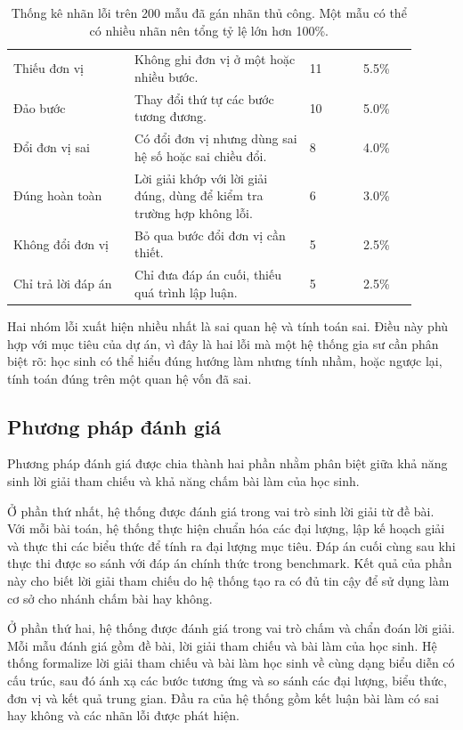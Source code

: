\documentclass[12pt,a4paper]{article}
\begin{document}
\begin{table}[H]
\begin{tabular}{p{0.27\linewidth} p{0.39\linewidth} p{0.12\linewidth} p{0.12\linewidth}}
        Thiếu đơn vị & Không ghi đơn vị ở một hoặc nhiều bước. & 11 & 5.5\% \\
        Đảo bước & Thay đổi thứ tự các bước tương đương. & 10 & 5.0\% \\
        Đổi đơn vị sai & Có đổi đơn vị nhưng dùng sai hệ số hoặc sai chiều đổi. & 8 & 4.0\% \\
        Đúng hoàn toàn & Lời giải khớp với lời giải đúng, dùng để kiểm tra trường hợp không lỗi. & 6 & 3.0\% \\
        Không đổi đơn vị & Bỏ qua bước đổi đơn vị cần thiết. & 5 & 2.5\% \\
        Chỉ trả lời đáp án & Chỉ đưa đáp án cuối, thiếu quá trình lập luận. & 5 & 2.5\% \\
        \bottomrule
    \end{tabular}
    \caption{Thống kê nhãn lỗi trên 200 mẫu đã gán nhãn thủ công. Một mẫu có thể có nhiều nhãn nên tổng tỷ lệ lớn hơn 100\%.}
\end{table}

Hai nhóm lỗi xuất hiện nhiều nhất là sai quan hệ và tính toán sai. Điều này phù
hợp với mục tiêu của dự án, vì đây là hai lỗi mà một hệ thống gia sư cần phân
biệt rõ: học sinh có thể hiểu đúng hướng làm nhưng tính nhầm, hoặc ngược lại,
tính toán đúng trên một quan hệ vốn đã sai.

\subsection{Phương pháp đánh giá}

Phương pháp đánh giá được chia thành hai phần nhằm phân biệt giữa khả năng sinh lời giải tham chiếu và khả năng chấm bài làm của học sinh.

Ở phần thứ nhất, hệ thống được đánh giá trong vai trò sinh lời giải từ đề bài. Với mỗi bài toán, hệ thống thực hiện chuẩn hóa các đại lượng, lập kế hoạch giải và thực thi các biểu thức để tính ra đại lượng mục tiêu. Đáp án cuối cùng sau khi thực thi được so sánh với đáp án chính thức trong benchmark. Kết quả của phần này cho biết lời giải tham chiếu do hệ thống tạo ra có đủ tin cậy để sử dụng làm cơ sở cho nhánh chấm bài hay không.

Ở phần thứ hai, hệ thống được đánh giá trong vai trò chấm và chẩn đoán lời giải. Mỗi mẫu đánh giá gồm đề bài, lời giải tham chiếu và bài làm của học sinh. Hệ thống formalize lời giải tham chiếu và bài làm học sinh về cùng dạng biểu diễn có cấu trúc, sau đó ánh xạ các bước tương ứng và so sánh các đại lượng, biểu thức, đơn vị và kết quả trung gian. Đầu ra của hệ thống gồm kết luận bài làm có sai hay không và các nhãn lỗi được phát hiện.
\end{document}
